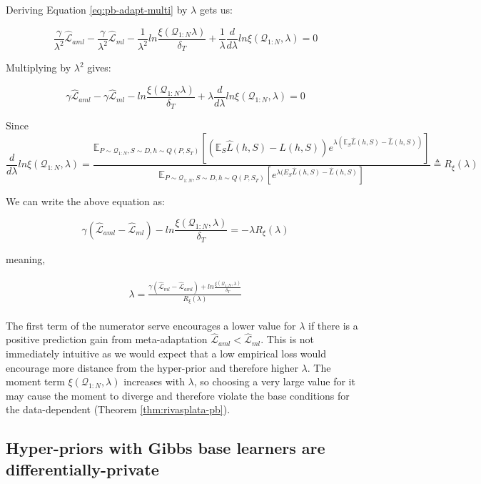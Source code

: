 \documentclass{article}
\theoremstyle{definition}
\newcommand{\Expect}[2]{\mathbb{E}_{#1}\left [#2 \right ]}
\begin{document}
Deriving Equation \ref{eq:pb-adapt-multi} by $\lambda$ gets us:

$$\frac{\gamma}{\lambda^2} \hat{\mathcal{L}}_{aml}-\frac{\gamma}{\lambda^2}\hat{\mathcal{L}}_{ml}-\frac{1}{\lambda^2}ln\frac{\xi(\mathcal{Q}_{1:N}\lambda)}{\delta_T}+\frac{1}{\lambda}\frac{d}{d\lambda}ln\xi(\mathcal{Q}_{1:N},\lambda)=0$$

Multiplying by $\lambda^2$ gives:

$$\gamma \hat{\mathcal{L}}_{aml}-\gamma\hat{\mathcal{L}}_{ml}-ln\frac{\xi(\mathcal{Q}_{1:N}\lambda)}{\delta_T}+\lambda\frac{d}{d\lambda}ln\xi(\mathcal{Q}_{1:N},\lambda)=0$$

Since 
$$\frac{d}{d\lambda}ln\xi(\mathcal{Q}_{1:N},\lambda)=\frac{\Expect{P\sim \mathcal{Q}_{1:N},S\sim D,h\sim Q(P,S_T)}{(\mathbb{E}_S\hat{L}(h, S)-\hat{L}(h, S))e^{\lambda(\mathbb{E}_S\hat{L}(h, S)-\hat{L}(h, S))} }}{\Expect{P\sim \mathcal{Q}_{1:N},S\sim D,h\sim Q(P,S_T)}{e^{\lambda(E_S\hat{L}(h, S)-\hat{L}(h, S)} }}\triangleq R_\xi(\lambda)$$

We can write the above equation as:

$$\gamma(\hat{\mathcal{L}}_{aml}-\hat{\mathcal{L}}_{ml})-ln\frac{\xi(\mathcal{Q}_{1:N},\lambda)}{\delta_T}=-\lambda R_\xi(\lambda)$$

meaning,

\begin{align} \label{eq:meta-pb-lambda}
\begin{split}
\lambda = \frac{\gamma(\hat{\mathcal{L}}_{ml}-\hat{\mathcal{L}}_{aml})+ln\frac{\xi(\mathcal{Q}_{1:N},\lambda)}{\delta_T}}{R_\xi(\lambda)}
\end{split}
\end{align}

The first term of the numerator serve encourages a lower value for $\lambda$ if there is a positive prediction gain from meta-adaptation $\hat{\mathcal{L}}_{aml}<\hat{\mathcal{L}}_{ml}$. This is not immediately intuitive as we would expect that a low empirical loss would encourage more distance from the hyper-prior and therefore higher $\lambda$. The moment term $\xi(\mathcal{Q}_{1:N}, \lambda)$ increases with $\lambda$, so choosing a very large value for it may cause the moment to diverge and therefore violate the base conditions for the data-dependent (Theorem \ref{thm:rivasplata-pb}). 

%
%
%

\subsection{Hyper-priors with Gibbs base learners are differentially-private} \label{append:proof-dp}
\end{document}
